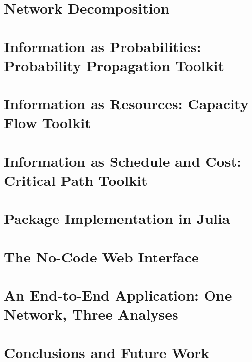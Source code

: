 \documentclass[a4paper,oneside,11pt]{book}
\begin{document}
\chapter{Network Decomposition}
\label{ch:diamond-module}


\chapter{Information as Probabilities: Probability Propagation Toolkit}
\label{ch:probability-toolkit}


\chapter{Information as Resources: Capacity Flow Toolkit}
\label{ch:capacity-toolkit}


\chapter{Information as Schedule and Cost: Critical Path Toolkit}
\label{ch:critical-path}


\chapter{Package Implementation in Julia}
\label{ch:julia-package}


\chapter{The No-Code Web Interface}
\label{ch:front-end}


\chapter{An End-to-End Application: One Network, Three Analyses}
\label{ch:integrated-case-study}


\chapter{Conclusions and Future Work}
\label{ch:conclusions}

\end{document}
